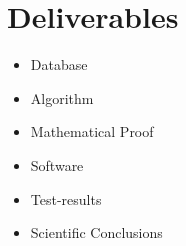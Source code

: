 \section{Deliverables}
\label{sec:deliverables}

\begin{itemize}
\item Database
\item Algorithm
\item Mathematical Proof
\item Software
\item Test-results
\item Scientific Conclusions
\end{itemize}